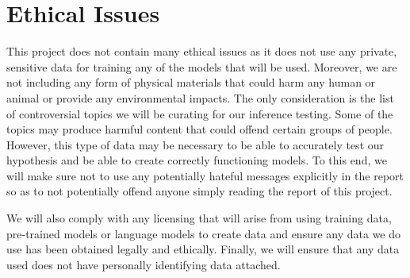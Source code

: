 \chapter{Ethical Issues}

This project does not contain many ethical issues as it does not use any private, sensitive data for training any of the models that will be used. Moreover, we are not including any form of physical materials that could harm any human or animal or provide any environmental impacts. The only consideration is the list of controversial topics we will be curating for our inference testing. Some of the topics may produce harmful content that could offend certain groups of people. However, this type of data may be necessary to be able to accurately test our hypothesis and be able to create correctly functioning models. To this end, we will make sure not to use any potentially hateful messages explicitly in the report so as to not potentially offend anyone simply reading the report of this project.

We will also comply with any licensing that will arise from using training data, pre-trained models or language models to create data and ensure any data we do use has been obtained legally and ethically. Finally, we will ensure that any data used does not have personally identifying data attached.